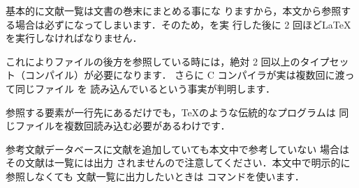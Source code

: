 基本的に文献一覧は文書の巻末にまとめる事にな
りますから，本文から参照する場合は必ずになってしまいます．そのため，\BibTeX を実
行した後に 2 回ほど\LaTeX を実行しなければなりません．

これによりファイルの後方を参照している時には，絶対
2 回以上のタイプセット（コンパイル）が必要になります．
さらに C コンパイラが実は複数回に渡って同じファイル  を
読み込んでいるという事実が判明します．


参照する要素が一行先にあるだけでも，\TeX のような伝統的なプログラムは
同じファイルを複数回読み込む必要があるわけです．



参考文献データベースに文献を追加していても本文中で参考していない
場合はその文献は一覧には出力
されませんので注意してください．本文中で明示的に参照しなくても
文献一覧に出力したいときは コマンドを使います．
\begin{usage}
\nocite{$\<ラベル>$}
\end{usage}

